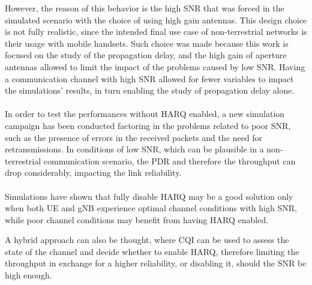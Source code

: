 However, the reason of this behavior is the high \ac{SNR} that was forced in the simulated scenario with the choice of using high gain antennas. This design choice is not fully realistic, since the intended final use case of non-terrestrial networks is their usage with mobile handsets. Such choice was made because this work is focused on the study of the propagation delay, and the high gain of aperture antennas allowed to limit the impact of the problems caused by low \ac{SNR}. Having a communication channel with high \ac{SNR} allowed for fewer variables to impact the simulations' results, in turn enabling the study of propagation delay alone.

\paragraph{}
In order to test the performances without \ac{HARQ} enabled, a new simulation campaign has been conducted factoring in the problems related to poor \ac{SNR}, such as the presence of errors in the received packets and the need for retransmissions. In conditions of low \ac{SNR}, which can be plausible in a non-terrestrial communication scenario, the \ac{PDR} and therefore the throughput can drop considerably, impacting the link reliability.
\paragraph{}
Simulations have shown that fully disable \ac{HARQ} may be a good solution only when both \ac{UE} and \ac{gNB} experience optimal channel conditions with high \ac{SNR}, while poor channel conditions may benefit from having \ac{HARQ} enabled.

A hybrid approach can also be thought, where \ac{CQI} can be used to assess the state of the channel and decide whether to enable \ac{HARQ}, therefore limiting the throughput in exchange for a higher reliability, or disabling it, should the \ac{SNR} be high enough.

